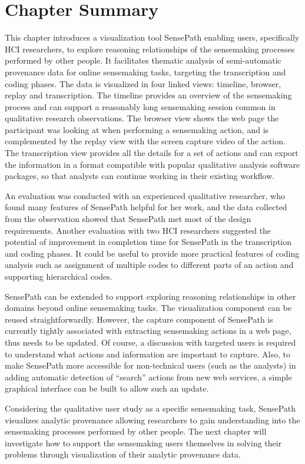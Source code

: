 \section{Chapter Summary}
This chapter introduces a visualization tool SensePath enabling users, specifically HCI researchers, to explore reasoning relationships of the sensemaking processes performed by other people. It facilitates thematic analysis of semi-automatic provenance data for online sensemaking tasks, targeting the transcription and coding phases. The data is visualized in four linked views: timeline, browser, replay and transcription. The timeline provides an overview of the sensemaking process and can support a reasonably long sensemaking session common in qualitative research observations. The browser view shows the web page the participant was looking at when performing a sensemaking action, and is complemented by the replay view with the screen capture video of the action. The transcription view provides all the details for a set of actions and can export the information in a format compatible with popular qualitative analysis software packages, so that analysts can continue working in their existing workflow.

An evaluation was conducted with an experienced qualitative researcher, who found many features of SensePath helpful for her work, and the data collected from the observation showed that SensePath met most of the design requirements. Another evaluation with two HCI researchers suggested the potential of improvement in completion time for SensePath in the transcription and coding phases. It could be useful to provide more practical features of coding analysis such as assignment of multiple codes to different parts of an action and supporting hierarchical codes. 

SensePath can be extended to support exploring reasoning relationships in other domains beyond online sensemaking tasks. The visualization component can be reused straightforwardly. However, the capture component of SensePath is currently tightly associated with extracting sensemaking actions in a web page, thus needs to be updated. Of course, a discussion with targeted users is required to understand what actions and information are important to capture.  Also, to make SensePath more accessible for non-technical users (such as the analysts) in adding automatic detection of ``search'' actions from new web services, a simple graphical interface can be built to allow such an update.

Considering the qualitative user study as a specific sensemaking task, SensePath visualizes analytic provenance allowing researchers to gain understanding into the sensemaking processes performed by other people. The next chapter will investigate how to support the sensemaking users themselves in solving their problems through visualization of their analytic provenance data.